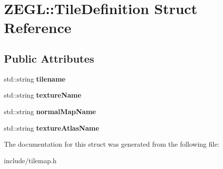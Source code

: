\hypertarget{struct_z_e_g_l_1_1_tile_definition}{}\section{Z\+E\+G\+L\+:\+:Tile\+Definition Struct Reference}
\label{struct_z_e_g_l_1_1_tile_definition}
\subsection*{Public Attributes}
\begin{DoxyCompactItemize}
\item 
\hypertarget{struct_z_e_g_l_1_1_tile_definition_a383fb02a80f3b673f641bd2f63b5111c}{}std\+::string {\bfseries tilename}\label{struct_z_e_g_l_1_1_tile_definition_a383fb02a80f3b673f641bd2f63b5111c}

\item 
\hypertarget{struct_z_e_g_l_1_1_tile_definition_ae967508462db81a11324cc1b44865437}{}std\+::string {\bfseries texture\+Name}\label{struct_z_e_g_l_1_1_tile_definition_ae967508462db81a11324cc1b44865437}

\item 
\hypertarget{struct_z_e_g_l_1_1_tile_definition_a8e72e785cf2a4b06542bbe968f46d2be}{}std\+::string {\bfseries normal\+Map\+Name}\label{struct_z_e_g_l_1_1_tile_definition_a8e72e785cf2a4b06542bbe968f46d2be}

\item 
\hypertarget{struct_z_e_g_l_1_1_tile_definition_aa6c3b90601b4a68e83eb39eb921c9647}{}std\+::string {\bfseries texture\+Atlas\+Name}\label{struct_z_e_g_l_1_1_tile_definition_aa6c3b90601b4a68e83eb39eb921c9647}

\end{DoxyCompactItemize}


The documentation for this struct was generated from the following file\+:\begin{DoxyCompactItemize}
\item 
include/tilemap.\+h\end{DoxyCompactItemize}
